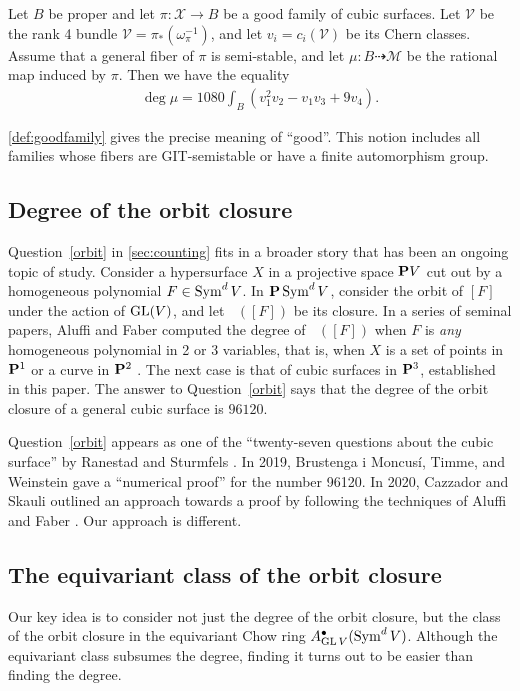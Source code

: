 \documentclass[12pt,reqno]{amsart}
\DeclareMathOperator{\Orb}{\overline{Orb}}
\renewcommand{\to}{{\longrightarrow}}
\numberwithin{equation}{section}
\newcommand{\V}{\mathcal V}
\newcommand{\cX}{\mathcal{X}}
\begin{document}
\begin{theorem}\label{theorem:main}
  Let $B$ be proper and let $\pi \colon \cX \to B$ be a good family of
  cubic surfaces. Let $\V$ be the rank 4 bundle
  $\V = \pi_* \left(\omega_\pi^{-1}\right)$, and let
  \(v_i = c_i\left(\V\right)\) be its Chern classes.  Assume that a
  general fiber of $\pi$ is semi-stable, and let
  $\mu \colon B \dashrightarrow \mathcal M$ be the rational map
  induced by $\pi$.  Then we have the equality
  \begin{align}
    \deg \mu =
    \label{eq:MAIN}
    1080 \int_{B} \left(v_{1}^{2}v_{2} - v_{1}v_{3}+ 9v_{4}\right).
  \end{align}
\end{theorem}
\autoref{def:goodfamily} gives the precise meaning of ``good''.  This
notion includes all families whose fibers are GIT-semistable or have a
finite automorphism group.

\subsection{Degree of the orbit closure}
Question~\ref{orbit} in \autoref{sec:counting} fits in a broader story
that has been an ongoing topic of study.  Consider a hypersurface
\(X\) in a projective space $\P V$ cut out by a homogeneous polynomial
$F \in \Sym^d V$.  In $\P\Sym^dV$, consider the orbit of $[F]$ under
the action of $\GL(V)$, and let $\Orb([F])$ be its closure.  In a
series of seminal papers, Aluffi and Faber computed the degree of
$\Orb([F])$ when \(F\) is {\sl any} homogeneous polynomial in 2 or 3
variables, that is, when \(X\) is a set of points in $\P^1$ or a curve
in $\P^2$ \cite{alu.fab:00,alu.fab:93}.  The next case is that of
cubic surfaces in $\P^3$, established in this paper.  The answer to
Question~\ref{orbit} says that the degree of the orbit closure of a
general cubic surface is $96120$.

Question~\ref{orbit} appears as one of the ``twenty-seven questions
about the cubic surface'' by Ranestad and Sturmfels \cite{ran.stu:20}.
In 2019, Brustenga i Moncus\'i, Timme, and Weinstein gave a
``numerical proof'' for the number 96120. In 2020, Cazzador and
Skauli outlined an approach towards a proof by following the
techniques of Aluffi and Faber \cite{bru-i-mon.tim.wei:20,caz.ska:20}.
Our approach is different.

\subsection{The equivariant class of the orbit closure}
Our key idea is to consider not just the degree of the orbit closure,
but the class of the orbit closure in the equivariant Chow ring
$A^\bullet_{\GL V}(\Sym^dV)$. Although the equivariant class subsumes the
degree, finding it turns out to be easier than finding the degree.
\end{document}
